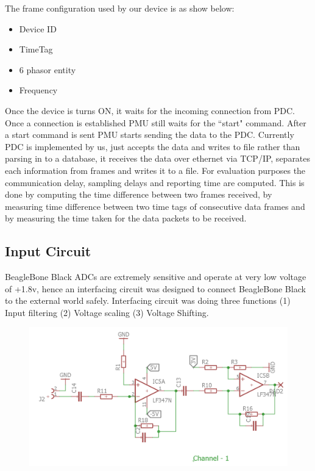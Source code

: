 The frame configuration used by our device is as show below:
\begin{itemize}
	\item Device ID
	\item TimeTag 
	\item 6 phasor entity 
	\item Frequency
\end{itemize}

Once the device is turns ON, it waits for the incoming connection from PDC. Once a connection is established PMU still waits for the ``start" command. After a start command is sent PMU starts sending the data to the PDC. Currently PDC is implemented by us, just accepts the data and writes to file rather than parsing in to a database, it receives the data over ethernet via TCP/IP, separates each information from frames and writes it to a file. For evaluation purposes the communication delay, sampling delays and reporting time are computed. This is done by computing the time difference between two frames received, by measuring time difference between two time tags of consecutive data frames and by measuring the time taken for the data packets to be received. 

\subsection{Input Circuit}
BeagleBone Black ADCs are extremely sensitive and operate at very low voltage of +1.8v, hence an interfacing circuit was designed to connect BeagleBone Black to the external world safely. Interfacing circuit was doing three functions (1) Input filtering (2) Voltage scaling (3) Voltage Shifting.

\begin{figure}[h]
	\centering
	\includegraphics[width=\textwidth]{fig/input_circuit.png}
\end{figure}

